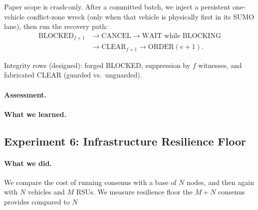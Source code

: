 \documentclass[letterpaper,10pt,conference]{IEEEtran}
\begin{document}
Paper scope is crash-only. After a committed batch, we inject a persistent
one-vehicle conflict-zone wreck (only when that vehicle is physically first
in its SUMO lane), then run the recovery path:
\begin{align*}
  \text{BLOCKED}_{f{+}1} &\to \text{CANCEL} \to \text{WAIT while BLOCKING} \\
  &\to \text{CLEAR}_{f{+}1} \to \text{ORDER}(e{+}1).
\end{align*}

Integrity rows (designed): forged BLOCKED, suppression by $f$ witnesses,
and fabricated CLEAR (guarded vs.\ unguarded).

\paragraph{Assessment.}

%
%
\paragraph{What we learned.}

%
%
%


\subsection{Experiment 6: Infrastructure Resilience Floor}
\label{sec:eval-rsu}

%
%
\paragraph{What we did.}

%
%
%
We compare the cost of running consenus with a base of $N$ nodes, and then again with $N$ vehicles and $M$ RSUs. We measure resilience floor the $M+N$ consenus provides compared to $N$
\end{document}
